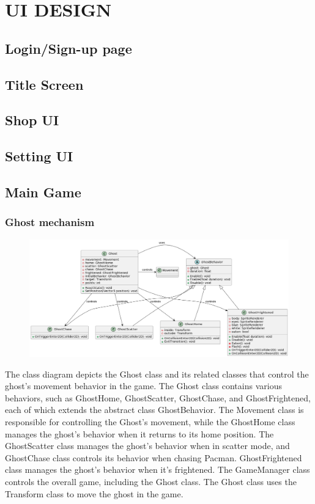 \documentclass[11pt]{article}
\begin{document}
\section{UI DESIGN}

\subsection{Login/Sign-up page}

\subsection{Title Screen}

\subsection{Shop UI}

\subsection{Setting UI}

\subsection{Main Game}

\subsubsection{Ghost mechanism}

\begin{figure}[H]
    \centering
    \includegraphics*[scale=0.4]{Ghost_Class.png}
\end{figure}

The class diagram depicts the Ghost class and its related classes that control the ghost's movement behavior in the game. The Ghost class contains various behaviors, such as GhostHome, GhostScatter, GhostChase, and GhostFrightened, each of which extends the abstract class GhostBehavior. The Movement class is responsible for controlling the Ghost's movement, while the GhostHome class manages the ghost's behavior when it returns to its home position. The GhostScatter class manages the ghost's behavior when in scatter mode, and GhostChase class controls its behavior when chasing Pacman. GhostFrightened class manages the ghost's behavior when it's frightened. The GameManager class controls the overall game, including the Ghost class. The Ghost class uses the Transform class to move the ghost in the game.
\end{document}
